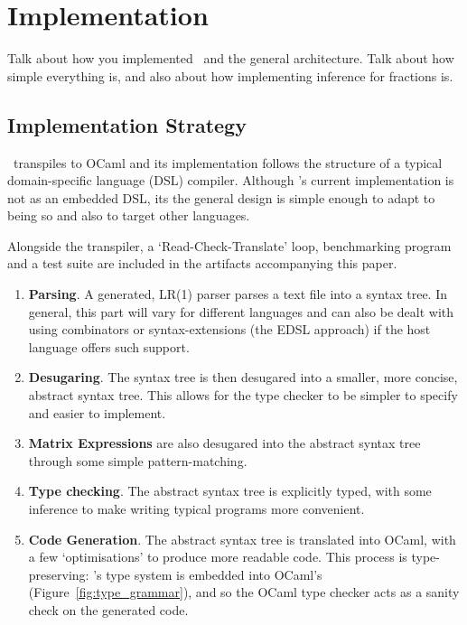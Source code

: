 \section{Implementation}\label{sec:implementation}

Talk about how you implemented \lang\ and the general
architecture. Talk about how simple everything is, and also
about how implementing inference for fractions is.

\subsection{Implementation Strategy}

\lang\ transpiles to OCaml and its implementation follows the structure of a
typical domain-specific language (DSL) compiler. Although \lang's current
implementation is not as an embedded DSL, its the general design is simple enough
to adapt to being so and also to target other languages.

Alongside the transpiler, a `Read-Check-Translate' loop, benchmarking program
and a test suite are included in the artifacts accompanying this paper.

\begin{enumerate}

    \item \textbf{Parsing}. A generated, LR(1) parser parses a text file into a
        syntax tree. In general, this part will vary for different languages
        and can also be dealt with using combinators or syntax-extensions (the
        EDSL approach) if the host language offers such support.

    \item \textbf{Desugaring}. The syntax tree is then desugared into a
        smaller, more concise, abstract syntax tree. This allows for the type
        checker to be simpler to specify and easier to implement.

    \item \textbf{Matrix Expressions} are also desugared into the abstract
        syntax tree through some simple pattern-matching.

    \item \textbf{Type checking}. The abstract syntax tree is explicitly typed,
        with some inference to make writing typical programs more convenient.

    \item \textbf{Code Generation}. The abstract syntax tree is translated into
        OCaml, with a few `optimisations' to produce more readable code. This
        process is type-preserving: \lang's type system is embedded into
        OCaml's (Figure~\ref{fig:type_grammar}), and so the OCaml type checker
        acts as a sanity check on the generated code.

\end{enumerate}

